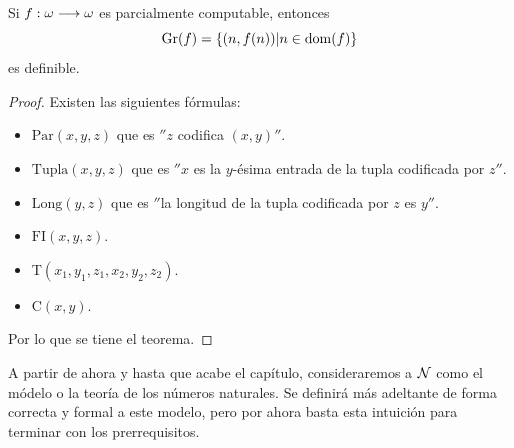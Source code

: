 \begin{thm}\label{teoremagrafica}
    Si $f:\omega\longrightarrow\omega$ es parcialmente computable, entonces \[\text{Gr}(f)=\{(n,f(n))|n\in\operatorname{dom}(f)\}\] es definible.
\end{thm}
\begin{proof}
    Existen las siguientes fórmulas:
    \begin{itemize}
        \item $\text{Par}(x,y,z)$ que es $''z$ codifica $(x,y)''$.
        \item $\text{Tupla}(x,y,z)$ que es $''x$ es la $y$-ésima entrada de la tupla codificada por $z''$.
        \item $\text{Long}(y,z)$ que es $''$la longitud de la tupla codificada por $z$ es $y''$.
        \item $\text{FI}(x,y,z)$.
        \item T$(x_1,y_1,z_1,x_2,y_2,z_2)$.
        \item C$(x,y)$.
    \end{itemize}
    Por lo que se tiene el teorema.
\end{proof}
A partir de ahora y hasta que acabe el capítulo, consideraremos a $\mathcal{N}$ como el módelo o la teoría de los números naturales. Se definirá más adeltante de forma correcta y formal a este modelo, pero por ahora basta esta intuición para terminar con los prerrequisitos.

